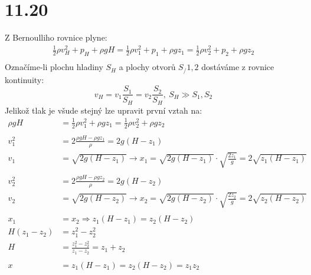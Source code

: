 \documentclass{article}
\begin{document}
    \section*{11.20}
    Z Bernoulliho rovnice plyne:
    $$
    \begin{aligned}
        \frac{1}{2}\rho v_H^2+p_H+\rho g H = \frac{1}{2}\rho v_1^2+p_1+\rho g z_1 = \frac{1}{2}\rho v_2^2+p_2+\rho g z_2\\
    \end{aligned}
    $$
    Označíme-li plochu hladiny $S_H$ a plochy otvorů $S_/{1,2}$ dostáváme z rovnice kontinuity:
    $$
    v_H = v_1 \frac{S_1}{S_H} = v_2 \frac{S_2}{S_H},\ S_H \gg S_1,S_2
    $$
    Jelikož tlak je všude stejný lze upravit první vztah na:
    $$
    \begin{aligned}
    \rho g H &= \frac{1}{2}\rho v_1^2+\rho g z_1 = \frac{1}{2}\rho v_2^2+\rho g z_2\\
    \\
    v_1^2 &= 2\frac{\rho g H - \rho g z_1}{\rho} = 2g(H - z_1)\\
    v_1 &= \sqrt{2g(H - z_1)} \rightarrow x_1 = \sqrt{2g(H - z_1)} \cdot \sqrt{\frac{2 z_1}{g}} = 2\sqrt{z_1(H - z_1)}\\
    \\
    v_2^2 &= 2\frac{\rho g H - \rho g z_2}{\rho} = 2g(H - z_2)\\
    v_2 &= \sqrt{2g(H - z_2)} \rightarrow x_2 = \sqrt{2g(H - z_2)} \cdot \sqrt{\frac{2 z_2}{g}} = 2\sqrt{z_2(H - z_2)}\\
    \\
    x_1 &= x_2 \Rightarrow z_1(H-z_1) = z_2(H-z_2)\\
    H(z_1-z_2) &= z_1^2-z_2^2\\
    H &= \frac{z_1^2-z_2^2}{z_1-z_2} = z_1 + z_2\\
    \\
    x &= z_1(H-z_1) = z_2(H-z_2) = z_1z_2
    \end{aligned}
    $$
\end{document}

